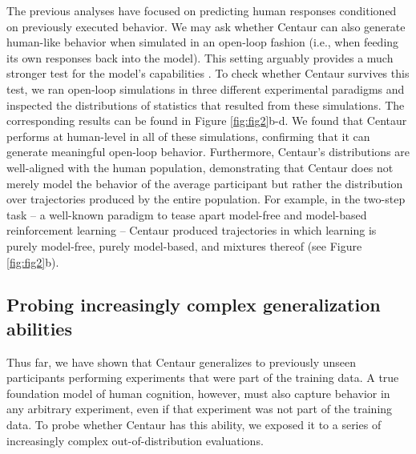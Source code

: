 \documentclass[pdflatex,sn-nature]{sn-jnl}%
\theoremstyle{thmstyleone}%
\theoremstyle{thmstyletwo}%
\theoremstyle{thmstylethree}%
\begin{document}
The previous analyses have focused on predicting human responses conditioned on previously executed behavior. We may ask whether Centaur can also generate human-like behavior when simulated in an open-loop fashion (i.e., when feeding its own responses back into the model). This setting arguably provides a much stronger test for the model’s capabilities \cite{palminteri2017importance}. To check whether Centaur survives this test, we ran open-loop simulations in three different experimental paradigms and inspected the distributions of statistics that resulted from these simulations. The corresponding results can be found in Figure \ref{fig:fig2}b-d. We found that Centaur performs at human-level in all of these simulations, confirming that it can generate meaningful open-loop behavior. Furthermore, Centaur's distributions are well-aligned with the human population, demonstrating that Centaur does not merely model the behavior of the average participant but rather the distribution over trajectories produced by the entire population. For example, in the two-step task -- a well-known paradigm to tease apart model-free and model-based reinforcement learning \cite{daw2011model} -- Centaur produced trajectories in which learning is purely model-free, purely model-based, and mixtures thereof (see Figure \ref{fig:fig2}b).

\subsection*{Probing increasingly complex generalization abilities}\label{subsec2}

Thus far, we have shown that Centaur generalizes to previously unseen participants performing experiments that were part of the training data. A true foundation model of human cognition, however, must also capture behavior in any arbitrary experiment, even if that experiment was not part of the training data. To probe whether Centaur has this ability, we exposed it to a series of increasingly complex out-of-distribution evaluations.
\end{document}
